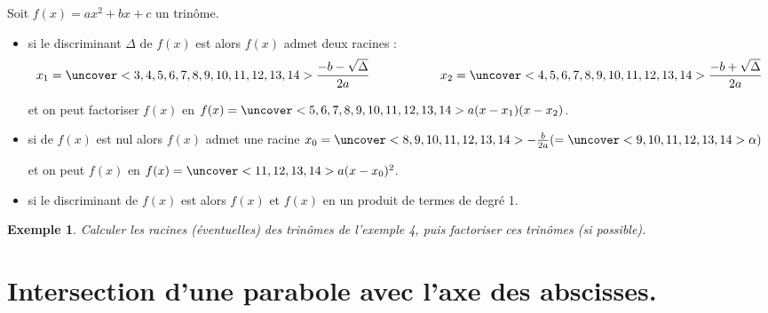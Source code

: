 \documentclass{beamer}
\newtheorem{exemple}{Exemple}
\begin{document}
  \begin{frame}
    \begin{theorem}[Central]
    Soit $f(x)=ax^2+bx+c$ un trinôme.
    \begin{itemize}
      \item  si le discriminant $\Delta$ de $f(x)$ est 
       alors $f(x)$ admet deux racines :
      $$x_1=\uncover<3,4,5,6,7,8,9,10,11,12,13,14>{\frac{-b-\sqrt{\Delta}}{2a}} 
      \hspace{2cm} x_2=
      \uncover<4,5,6,7,8,9,10,11,12,13,14>{\frac{-b+\sqrt{\Delta}}{2a}}$$
     
      et on peut factoriser $f(x)$ en $f(x)=
      \uncover<5,6,7,8,9,10,11,12,13,14>{a(x-x_1)(x-x_2)}$.
     
      \item si  de $f(x)$ est nul alors $f(x)$ admet une racine 
     $x_0=\uncover<8,9,10,11,12,13,14>{-\frac{b}{2a}}(=\uncover<9,10,11,12,13,14>{\alpha})$
     
     et on peut  $f(x)$ en $f(x)=
     \uncover<11,12,13,14>{a(x-x_0)^2}$.
     \item si le discriminant de $f(x)$ est  
     alors $f(x)$  et 
      $f(x)$ en un produit de termes de degré 1.
    \end{itemize}    
  \end{theorem}
  \end{frame}


\begin{frame}
  \begin{exemple}
    Calculer les racines (éventuelles) des trinômes de l'exemple 4, puis factoriser
    ces trinômes (si possible).
   \end{exemple}
\end{frame}

\begin{frame}
 
\end{frame}




  \section{Intersection d'une parabole avec l'axe des abscisses.}
    
\end{document}
